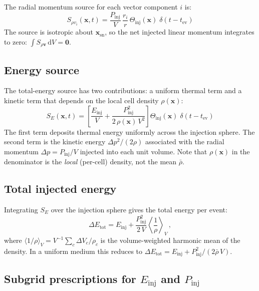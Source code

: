 \documentclass[11pt]{article}
\begin{document}
The radial momentum source for each vector component $i$ is:
\begin{equation}
  \boxed{
  S_{\rho v_i}(\mathbf{x}, t) =
    \frac{P_\mathrm{inj}}{V}\,\frac{r_i}{r}\,
    \Theta_\mathrm{inj}(\mathbf{x})\;
    \delta(t - t_\mathrm{ev})
  }
\end{equation}
The source is isotropic about $\mathbf{x}_\mathrm{sn}$, so the net injected
linear momentum integrates to zero: $\int S_{\rho\mathbf{v}}\,\mathrm{d}V = \mathbf{0}$.

\subsection*{Energy source}

The total-energy source has two contributions: a uniform thermal term and a
kinetic term that depends on the local cell density $\rho(\mathbf{x})$:
\begin{equation}
  \boxed{
  S_E(\mathbf{x}, t) =
    \left[
      \frac{E_\mathrm{inj}}{V}
      + \frac{P_\mathrm{inj}^2}{2\,\rho(\mathbf{x})\,V^2}
    \right]
    \Theta_\mathrm{inj}(\mathbf{x})\;
    \delta(t - t_\mathrm{ev})
  }
\end{equation}
The first term deposits thermal energy uniformly across the injection sphere.
The second term is the kinetic energy $\Delta p^2/(2\rho)$ associated with the
radial momentum $\Delta p = P_\mathrm{inj}/V$ injected into each unit volume.
Note that $\rho(\mathbf{x})$ in the denominator is the \emph{local} (per-cell)
density, not the mean $\bar{\rho}$.

\subsection*{Total injected energy}

Integrating $S_E$ over the injection sphere gives the total energy per event:
\begin{equation}
  \Delta E_\mathrm{tot} = E_\mathrm{inj}
    + \frac{P_\mathrm{inj}^2}{2\,V}
      \left\langle \frac{1}{\rho} \right\rangle_V\,,
\end{equation}
where $\langle 1/\rho \rangle_V = V^{-1}\sum_c \Delta V_c / \rho_c$ is the
volume-weighted harmonic mean of the density.  In a uniform medium this
reduces to $\Delta E_\mathrm{tot} = E_\mathrm{inj} + P_\mathrm{inj}^2 /
(2\bar{\rho}\,V)$.

\subsection*{Subgrid prescriptions for $E_\mathrm{inj}$ and $P_\mathrm{inj}$}
\end{document}
